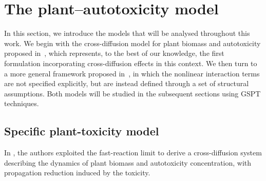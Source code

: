 \documentclass[a4paper,10pt,abstract=true,parskip=true]{scrartcl}
\theoremstyle{remark}
\numberwithin{equation}{section}
\numberwithin{thm}{section}
\begin{document}

\section{The plant--autotoxicity model}\label{sec:model} 
In this section, we introduce the models that will be analysed throughout this work. We begin with the cross-diffusion model for plant biomass and autotoxicity proposed in~\cite{GIS_2026}, which represents, to the best of our knowledge, the first formulation incorporating cross-diffusion effects in this context. We then turn to a more general framework proposed in~\cite{Morgan_etal.2025}, in which the nonlinear interaction terms are not specified explicitly, but are instead defined through a set of structural assumptions. Both models will be studied in the subsequent sections using GSPT techniques.

\subsection{Specific plant-toxicity model} \label{sec:model_specific} 
In \cite{GIS_2026}, the authors exploited the fast-reaction limit to derive a cross-diffusion system describing the dynamics of plant biomass and autotoxicity concentration, with propagation reduction induced by the toxicity.
\end{document}

